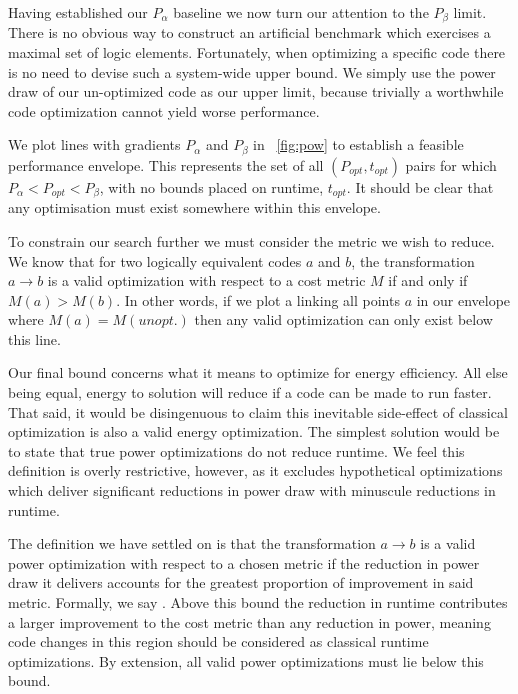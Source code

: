 Having established our $P_{\alpha}$ baseline we now turn our attention to the $P_{\beta}$ limit. There is no obvious way to construct an artificial benchmark which exercises a maximal set of logic elements. Fortunately, when optimizing a specific code there is no need to devise such a system-wide upper bound. We simply use the power draw of our  un-optimized code as our upper limit, because trivially a worthwhile code optimization cannot yield worse performance.

We plot lines with gradients $P_{\alpha}$ and $P_{\beta}$ in \figurename~\ref{fig:pow} to establish a feasible performance envelope. This represents the set of all $(P_{opt}, t_{opt})$ pairs for which $P_{\alpha} < P_{opt} < P_{\beta}$, with no bounds placed on runtime, $t_{opt}$. It should be clear that any optimisation must exist somewhere within this envelope.

To constrain our search further we must consider the metric we wish to reduce. We know that for two logically equivalent codes $a$ and $b$, the transformation $a \to b$ is a valid optimization with respect to a cost metric $M$ if and only if $M(a) > M(b)$. In other words, if we plot a linking all points $a$ in our envelope where $M(a) = M(unopt.)$ then any valid optimization can only exist below this line.

Our final bound concerns what it means to optimize for energy efficiency. All else being equal, energy to solution will reduce if a code can be made to run faster. That said, it would be disingenuous to claim this inevitable side-effect of classical optimization is also a valid energy optimization. The simplest solution would be to state that true power optimizations do not reduce runtime. We feel this definition is overly restrictive, however, as it excludes hypothetical optimizations which deliver significant reductions in power draw with minuscule reductions in runtime.

The definition we have settled on is that the transformation $a \to b$ is a valid power optimization with respect to a chosen metric if the reduction in power draw it delivers accounts for the greatest proportion of improvement in said metric. Formally, we say . Above this bound the reduction in runtime contributes a larger improvement to the cost metric than any reduction in power, meaning code changes in this region should be considered as classical runtime optimizations. By extension, all valid power optimizations must lie below this bound.


